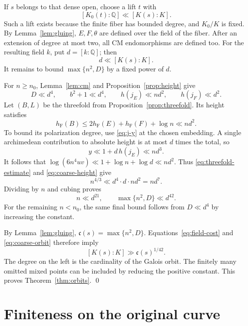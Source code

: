 \documentclass[11pt,a4paper]{article}
\numberwithin{equation}{section}
\theoremstyle{definition}
\theoremstyle{remark}
\newcommand{\Q}{\mathbb Q}
\newcommand{\hF}{h_{\mathrm F}}
\newcommand{\cplx}{\mathfrak c}
\begin{document}
If \(s\) belongs to that dense open, choose a lift \(t\) with
\[
 [K_0(t):\Q]\ll [K(s):K].
\]
Such a lift exists because the finite fiber has bounded degree,
and \(K_0/K\) is fixed. By Lemma~\ref{lem:gluing}, \(E,F,\theta\)
are defined over the field of the fiber. After an extension of
degree at most two, all CM endomorphisms are defined too.
For the resulting field \(k\), put \(d=[k:\Q]\); then
\begin{equation}\label{eq:field-cost}
 d\ll [K(s):K].
\end{equation}
It remains to bound \(\max\{n^2,D\}\) by a fixed power of \(d\).

For \(n\ge n_0\), Lemma~\ref{lem:cm} and
Proposition~\ref{prop:height} give
\begin{equation}\label{eq:coarse-height}
 D\ll d^4,\qquad b^2+1\ll d^4,\qquad
 h(j_E)\ll n d^2,\qquad h(j_F)\ll d^2.
\end{equation}
Let \((B,L)\) be the threefold from Proposition~\ref{prop:threefold}.
Its height satisfies
\[
 \hF(B)\le2\hF(E)+\hF(F)+\log n\ll nd^2.
\]
To bound its polarization degree, use \eqref{eq:j-y} at the chosen
embedding. A single archimedean contribution to absolute height
is at most \(d\) times the total, so
\[
 y\ll1+d\,h(j_E)\ll nd^3.
\]
It follows that
\(\log(6n^4uv)\ll1+\log n+\log d\ll nd^2\).
Thus \eqref{eq:threefold-estimate} and \eqref{eq:coarse-height} give
\[
 n^{4/3}\ll d^4\cdot d\cdot nd^2=nd^7.
\]
Dividing by \(n\) and cubing proves
\begin{equation}\label{eq:coarse-orbit}
 n\ll d^{21},\qquad
 \max\{n^2,D\}\ll d^{42}.
\end{equation}
For the remaining \(n<n_0\), the same final bound follows from
\(D\ll d^4\) by increasing the constant.

By Lemma~\ref{lem:gluing}, \(\cplx(s)=\max\{n^2,D\}\).
Equations~\eqref{eq:field-cost} and \eqref{eq:coarse-orbit} therefore
imply
\[
 [K(s):K]\gg\cplx(s)^{1/42}.
\]
The degree on the left is the cardinality of the Galois orbit.
The finitely many omitted mixed points can be included by reducing
the positive constant. This proves Theorem~\ref{thm:orbits}.
\qed

\section{Finiteness on the original curve}\label{sec:finiteness}
\end{document}
